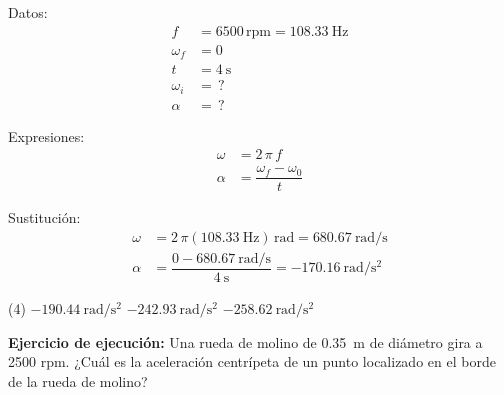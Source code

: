 \documentclass[12pt, letter]{exam}
\begin{document}
\begin{questions}
    \begin{minipage}[t]{0.4\linewidth}
    Datos: 
    \begin{align*}
    f &= 6500 \, \text{rpm} = \SI{108.33}{\hertz} \\
    \omega_{f} &= 0 \\
    t &= \SI{4}{\second} \\
    \omega_{i} &= \, ? \\
    \alpha &= \, ?
    \end{align*}
    \end{minipage}
    \hspace{1cm}
    \begin{minipage}[t]{0.4\linewidth}
    Expresiones:
    \begin{align*}
    \omega &= 2 \, \pi \, f \\
    \alpha &= \dfrac{\omega_{f} - \omega_{0}}{t}
    \end{align*}
    \end{minipage}

    Sustitución:
    \begin{align*}
    \omega &= 2 \, \pi (\SI{108.33}{\hertz}) \, \unit{\radian} = \SI{680.67}{\radian\per\second} \\[0.5em]
    \alpha &= \dfrac{ 0 - \SI{680.67}{\radian\per\second}}{\SI{4}{\second}} = - \SI[per-mode=fraction]{170.16}{\radian\per\square\second}
    \end{align*}

    \vspace{0.3cm}
    \begin{tasks}(4)
        \task {}
        \task $\displaystyle - \SI{190.44}{\radian\per\square\second}$
        \task $\displaystyle - \SI{242.93}{\radian\per\square\second}$
        \task $\displaystyle - \SI{258.62}{\radian\per\square\second}$
    \end{tasks}
    \question \label{Ejercicio_03} \textbf{Ejercicio de ejecución: } Una rueda de molino de \SI{0.35}{\meter} de diámetro gira a \num{2500} rpm. ¿Cuál es la aceleración centrípeta de un punto localizado en el borde de la rueda de molino?
    

\end{questions}
\end{document}
